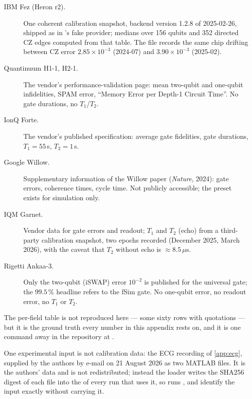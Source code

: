 \begin{description}
\item[IBM Fez (Heron r2).]  One coherent calibration snapshot, backend version 1.2.8 of
2025-02-26, shipped as  in 's fake provider;
medians over 156 qubits and 352 directed CZ edges computed from that table.  The file records
the same chip drifting between CZ error $2.85\times10^{-3}$ (2024-07) and $3.90\times10^{-3}$
(2025-02).
\item[Quantinuum H1-1, H2-1.]  The vendor's performance-validation page: mean two-qubit and
one-qubit infidelities, SPAM error, ``Memory Error per Depth-1 Circuit Time''.  No gate
durations, no $T_1$/$T_2$.
\item[IonQ Forte.]  The vendor's published specification: average gate fidelities, gate
durations, $T_1=55$\,s, $T_2=1$\,s.
\item[Google Willow.]  Supplementary information of the Willow paper (\emph{Nature}, 2024):
gate errors, coherence times, cycle time.  Not publicly accessible; the preset exists for
simulation only.
\item[IQM Garnet.]  Vendor data for gate errors and readout; $T_1$ and $T_2$ (echo) from a
third-party calibration snapshot, two epochs recorded (December 2025, March 2026), with the
caveat that $T_2$ without echo is $\approx8.5\,\mu$s.
\item[Rigetti Ankaa-3.]  Only the two-qubit (iSWAP) error $10^{-2}$ is published for the
universal gate; the $99.5\,\%$ headline refers to the fSim gate.  No one-qubit error, no
readout error, no $T_1$ or $T_2$.
\end{description}

The per-field table is not reproduced here --- some sixty rows with quotations --- but it is
the ground truth every number in this appendix rests on, and it is one command away in the
repository at \repourl.

One experimental input is not calibration data: the ECG recording of \cref{app:ecg}, supplied by
the authors by e-mail on 21 August 2026 as two MATLAB files.  It is the authors' data and is not
redistributed; instead the loader writes the SHA256 digest of each file into the 
of every run that uses it, so runs ,  and
 identify the input exactly without carrying it.
